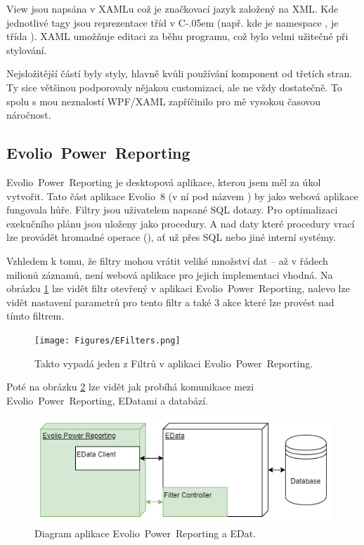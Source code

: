 \documentclass[czech,bachelorpractice,dept460,male,csharp]{diploma}
\newcommand{\EvolioEight}{Evolio~8}
\newcommand{\EFilters}{Evolio~Power~Reporting}
\newcommand{\Csharp}{%
  {\settoheight{\dimen0}{C}C\kern-.05em \resizebox{!}{\dimen0}{\raisebox{\depth}{\#}}}}
\begin{document}
			View jsou napsána v XAMLu což je značkovací jazyk založený na XML. Kde jednotlivé tagy jsou reprezentace tříd v {\Csharp} (např.  kde  je namespace , je třída  ). XAML umožňuje editaci za běhu programu, což bylo velmi užitečné při stylování. 
			
			Nejsložitější částí byly styly, hlavně kvůli používání komponent od třetích stran. Ty sice většinou podporovaly nějakou customizaci, ale ne vždy dostatečně. To spolu s mou neznalostí WPF/XAML zapříčinilo pro mě vysokou časovou náročnost.
	\subsection{\EFilters}
		{\EFilters} je desktopová aplikace, kterou jsem měl za úkol vytvořit. Tato část aplikace {\EvolioEight} (v ní pod názvem ) by jako webová aplikace fungovala hůře.
		Filtry jsou uživatelem napsané SQL dotazy. Pro optimalizaci exekučního plánu jsou uloženy jako procedury. A nad daty které procedury vrací lze provádět hromadné operace (), ať už přes SQL nebo jiné interní systémy.
		
		Vzhledem k tomu, že filtry mohou vrátit veliké množství dat – až v řádech milionů záznamů, není webová aplikace pro jejich implementaci vhodná. Na obrázku \ref{fig:EFilters} lze vidět filtr otevřený v aplikaci {\EFilters}, nalevo lze vidět nastavení parametrů pro tento filtr a také 3 akce které lze provést nad tímto filtrem.

			
			\begin{figure}[h!]
				\texttt{[image: Figures/EFilters.png]}
				\caption{Takto vypadá jeden z Filtrů v aplikaci {\EFilters}.}
    			\label{fig:EFilters}
			\end{figure}
					Poté na obrázku \ref{fig:EFiltersDiagram} lze vidět jak probíhá komunikace mezi \EFilters, EDatami a databází.
			\begin{figure}[h]
				\includegraphics[width=1.0\textwidth]{Figures/EfiltersDiagram.png}
				\caption{Diagram aplikace {\EFilters} a EDat.}
    			\label{fig:EFiltersDiagram}
			\end{figure}
\end{document}

